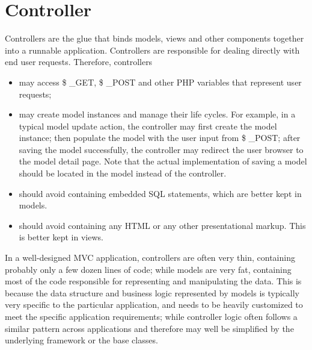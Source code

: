 \section{Controller} 

Controllers are the glue that binds models, views and other components together into a runnable application. Controllers are responsible for dealing directly with end user requests. Therefore, controllers
\begin{itemize}
\item may access \$ \_GET, \$ \_POST and other PHP variables that represent user requests;
\item may create model instances and manage their life cycles. For example, in a typical model update action, the controller may first create the model instance; then populate the model with the user input from \$ \_POST; after saving the model successfully, the controller may redirect the user browser to the model detail page. Note that the actual implementation of saving a model should be located in the model instead of the controller.
\item should avoid containing embedded SQL statements, which are better kept in models.
\item should avoid containing any HTML or any other presentational markup. This is better kept in views.
\end{itemize}

In a well-designed MVC application, controllers are often very thin, containing probably only a few dozen lines of code; while models are very fat, containing most of the code responsible for representing and manipulating the data. This is because the data structure and business logic represented by models is typically very specific to the particular application, and needs to be heavily customized to meet the specific application requirements; while controller logic often follows a similar pattern across applications and therefore may well be simplified by the underlying framework or the base classes.

